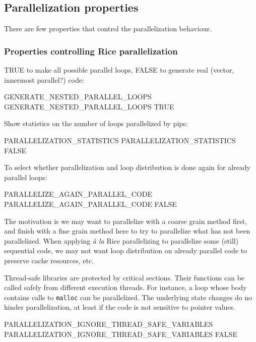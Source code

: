 \documentclass[a4paper]{report}
\begin{document}
\subsection{Parallelization properties}


There are few properties that control the parallelization behaviour.

\subsubsection{Properties controlling Rice parallelization}

TRUE to make all possible parallel loops, FALSE to generate real (vector,
innermost parallel?) code:
\begin{PipsProp}{GENERATE_NESTED_PARALLEL_LOOPS}
GENERATE_NESTED_PARALLEL_LOOPS TRUE
\end{PipsProp}

Show statistics on the number of loops parallelized by pips:
\begin{PipsProp}{PARALLELIZATION_STATISTICS}
PARALLELIZATION_STATISTICS FALSE
\end{PipsProp}


To select whether parallelization and loop distribution is done again for
already parallel loops:
\begin{PipsProp}{PARALLELIZE_AGAIN_PARALLEL_CODE}
PARALLELIZE_AGAIN_PARALLEL_CODE FALSE
\end{PipsProp}
The motivation is we may want to parallelize with a coarse grain method
first, and finish with a fine grain method here to try to parallelize what
has not been parallelized.  When applying \emph{\`a la} Rice parallelizing
to parallelize some (still) sequential code, we may not want loop
distribution on already parallel code to preserve cache resources, etc.

Thread-safe libraries are protected by critical sections. Their
functions can be called safely from different execution threads. For
instance, a loop whose body contains calls to \verb/malloc/ can be
parallelized. The underlying state changes do no hinder
parallelization, at least if the code is not sensitive to pointer
values.

\begin{PipsProp}{PARALLELIZATION_IGNORE_THREAD_SAFE_VARIABLES}
PARALLELIZATION_IGNORE_THREAD_SAFE_VARIABLES FALSE
\end{PipsProp}
\end{document}
